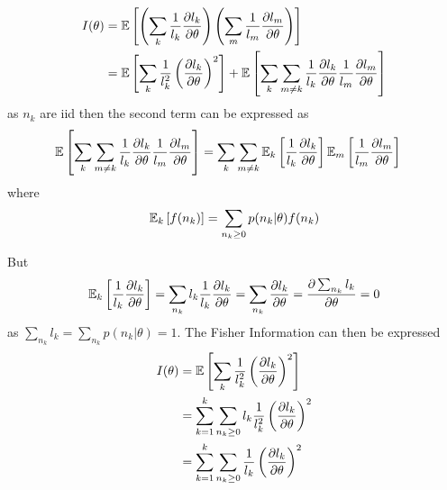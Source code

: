 \begin{alignat*}{1}
	I(\theta) & =\mathbb{E}\left[\left(\sum_k\frac{1}{l_k}\frac{\partial l_k}{\partial\theta}\right)\left(\sum_m\frac{1}{l_m}\frac{\partial l_m}{\partial\theta}\right)\right]\\
	 & =\mathbb{E}\left[\sum_k\frac{1}{l_k^2}\left(\frac{\partial l_k}{\partial\theta}\right)^2\right]+\mathbb{E}\left[\sum_k\sum_{m\neq k}\frac{1}{l_k}\frac{\partial l_k}{\partial\theta}\frac{1}{l_m}\frac{\partial l_m}{\partial\theta}\right]
\end{alignat*}
%
as $n_k$ are iid then the second term can be expressed as 
%
\begin{align*}
	\mathbb{E}\left[\sum_k\sum_{m\neq k}\frac{1}{l_k}\frac{\partial l_k}{\partial\theta}\frac{1}{l_m}\frac{\partial l_m}{\partial\theta}\right] 
	& =\sum_k\sum_{m\neq k}\mathbb{E}_k\left[\frac{1}{l_k}\frac{\partial l_k}{\partial\theta}\right]\mathbb{E}_m\left[\frac{1}{l_m}\frac{\partial l_m}{\partial\theta}\right]
\end{align*}
%
where
%
\begin{equation}
	\mathbb{E}_k\left[f(n_k)\right]=\sum_{n_k\geq0}p(n_k|\theta)f(n_k)
\end{equation}

But 
%
\begin{equation}
	\mathbb{E}_k\left[\frac{1}{l_k}\frac{\partial l_k}{\partial\theta}\right]=\sum_{n_k}l_k\frac{1}{l_k}\frac{\partial l_k}{\partial\theta}=\sum_{n_k}\frac{\partial l_k}{\partial\theta}=\frac{\partial\sum_{n_k}l_k}{\partial\theta}=0
\end{equation}
%
as $\sum_{n_k}l_k=\sum_{n_k}p(n_k|\theta)=1$. The Fisher Information can then be expressed 
%
\begin{align*}
	I(\theta) & =\mathbb{E}\left[\sum_k\frac{1}{l_k^2}\left(\frac{\partial l_k}{\partial\theta}\right)^2\right]\\
	 & =\sum_{k=1}^k\sum_{n_k\geq0}l_k\frac{1}{l_k^2}\left(\frac{\partial l_k}{\partial\theta}\right)^2\\
	 & =\sum_{k=1}^k\sum_{n_k\geq0}\frac{1}{l_k}\left(\frac{\partial l_k}{\partial\theta}\right)^2
\end{align*}

